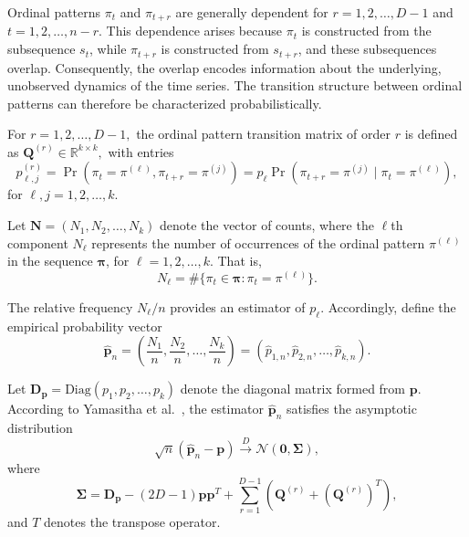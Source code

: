 \documentclass[12pt,a4paper]{article}
\begin{document}
Ordinal patterns $\pi_t$ and $\pi_{t+r}$ are generally dependent for $r=1,2,\dots,D-1$ and $t=1,2,\dots,n-r$. This dependence arises because $\pi_t$ is constructed from the subsequence $s_t$, while $\pi_{t+r}$ is constructed from $s_{t+r}$, and these subsequences overlap. Consequently, the overlap encodes information about the underlying, unobserved dynamics of the time series. The transition structure between ordinal patterns can therefore be characterized probabilistically.

For $r=1,2,\dots,D-1,$ the ordinal pattern transition matrix of order $r$ is defined as $\mathbf{Q}^{(r)} \in \mathbb{R}^{k \times k},$ with entries
\begin{equation}
	p^{(r)}_{\ell,j} = \Pr(\pi_t = \pi^{(\ell)}, \pi_{t+r} = \pi^{(j)}) 
	= p_\ell \Pr(\pi_{t+r} = \pi^{(j)} \mid \pi_t = \pi^{(\ell)}),
\end{equation}
for $\ell, j = 1,2,\dots,k.$

Let $\mathbf{N} = (N_1, N_2, \dots, N_k)$ denote the vector of counts, where the $\ell$th component $N_\ell$ represents the number of occurrences of the ordinal pattern $\pi^{(\ell)}$ in the sequence $\boldsymbol{\pi}$, for $\ell = 1,2,\dots,k.$ That is,
\begin{equation}
	N_\ell = \#\{\pi_t \in \boldsymbol{\pi} : \pi_t = \pi^{(\ell)}\}.
\end{equation}

The relative frequency $N_\ell / n$ provides an estimator of $p_\ell$. Accordingly, define the empirical probability vector
\begin{equation}
	\hat{\mathbf{p}}_n = \left(\frac{N_1}{n}, \frac{N_2}{n}, \dots, \frac{N_k}{n}\right) 
	= (\hat{p}_{1,n}, \hat{p}_{2,n}, \dots, \hat{p}_{k,n}).
\end{equation}

Let $\mathbf{D}_{\mathbf{p}} = \mathrm{Diag}(p_1, p_2, \dots, p_k)$ denote the diagonal matrix formed from $\mathbf{p}$. According to Yamasitha et al.~\cite{YamashitaRiosDeSousa2022}, the estimator $\hat{\mathbf{p}}_n$ satisfies the asymptotic distribution
\begin{equation}
	\sqrt{n}(\hat{\mathbf{p}}_n - \mathbf{p}) \xrightarrow{D} \mathcal{N}(\mathbf{0}, \boldsymbol{\Sigma}),
\end{equation}
where
\begin{equation}
	\boldsymbol{\Sigma} = \mathbf{D}_{\mathbf{p}} - (2D-1)\mathbf{p}\mathbf{p}^T 
	+ \sum_{r=1}^{D-1} \left( \mathbf{Q}^{(r)} + (\mathbf{Q}^{(r)})^T \right),
\end{equation}
and $T$ denotes the transpose operator.
\end{document}

